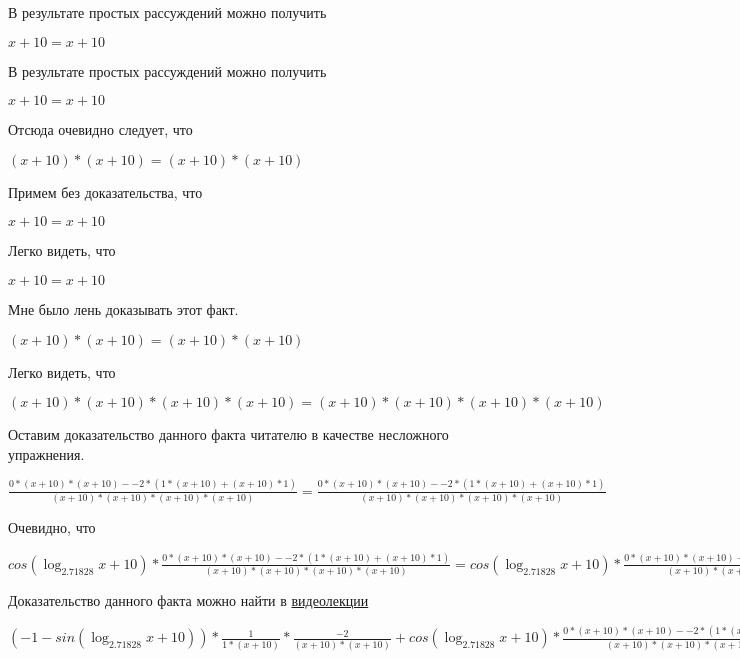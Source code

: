 \documentclass[12pt,a4paper,fleqn]{article}
\theoremstyle{definition}
\begin{document}
В результате простых рассуждений можно получить 

$ x  +  10  =  x  +  10 $

В результате простых рассуждений можно получить 

$ x  +  10  =  x  +  10 $

Отсюда очевидно следует, что 

$( x  +  10 ) * ( x  +  10 ) = ( x  +  10 ) * ( x  +  10 )$

Примем без доказательства, что 

$ x  +  10  =  x  +  10 $

Легко видеть, что 

$ x  +  10  =  x  +  10 $

Мне было лень доказывать этот факт.

$( x  +  10 ) * ( x  +  10 ) = ( x  +  10 ) * ( x  +  10 )$

Легко видеть, что 

$( x  +  10 ) * ( x  +  10 ) * ( x  +  10 ) * ( x  +  10 ) = ( x  +  10 ) * ( x  +  10 ) * ( x  +  10 ) * ( x  +  10 )$

Оставим доказательство данного факта читателю в качестве несложного упражнения. 

$\frac{ 0  * ( x  +  10 ) * ( x  +  10 ) -  -2  * ( 1  * ( x  +  10 ) + ( x  +  10 ) *  1 )}{( x  +  10 ) * ( x  +  10 ) * ( x  +  10 ) * ( x  +  10 )}
 = \frac{ 0  * ( x  +  10 ) * ( x  +  10 ) -  -2  * ( 1  * ( x  +  10 ) + ( x  +  10 ) *  1 )}{( x  +  10 ) * ( x  +  10 ) * ( x  +  10 ) * ( x  +  10 )}
$

Очевидно, что 

$cos(\log_{ 2.71828 }{ x  +  10 }) * \frac{ 0  * ( x  +  10 ) * ( x  +  10 ) -  -2  * ( 1  * ( x  +  10 ) + ( x  +  10 ) *  1 )}{( x  +  10 ) * ( x  +  10 ) * ( x  +  10 ) * ( x  +  10 )}
 = cos(\log_{ 2.71828 }{ x  +  10 }) * \frac{ 0  * ( x  +  10 ) * ( x  +  10 ) -  -2  * ( 1  * ( x  +  10 ) + ( x  +  10 ) *  1 )}{( x  +  10 ) * ( x  +  10 ) * ( x  +  10 ) * ( x  +  10 )}
$

Доказательство данного факта можно найти в \href{https://www.youtube.com/watch?v=dQw4w9WgXcQ}{видеолекции} 

$( -1  - sin(\log_{ 2.71828 }{ x  +  10 })) * \frac{ 1 }{ 1  * ( x  +  10 )}
 * \frac{ -2 }{( x  +  10 ) * ( x  +  10 )}
 + cos(\log_{ 2.71828 }{ x  +  10 }) * \frac{ 0  * ( x  +  10 ) * ( x  +  10 ) -  -2  * ( 1  * ( x  +  10 ) + ( x  +  10 ) *  1 )}{( x  +  10 ) * ( x  +  10 ) * ( x  +  10 ) * ( x  +  10 )}
 = ( -1  - sin(\log_{ 2.71828 }{ x  +  10 })) * \frac{ 1 }{ 1  * ( x  +  10 )}
 * \frac{ -2 }{( x  +  10 ) * ( x  +  10 )}
 + cos(\log_{ 2.71828 }{ x  +  10 }) * \frac{ 0  * ( x  +  10 ) * ( x  +  10 ) -  -2  * ( 1  * ( x  +  10 ) + ( x  +  10 ) *  1 )}{( x  +  10 ) * ( x  +  10 ) * ( x  +  10 ) * ( x  +  10 )}
$
\end{document}
